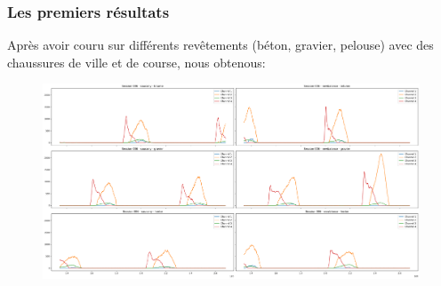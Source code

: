 \begin{frame}
    \frametitle{Les premiers résultats}
    Après avoir couru sur différents revêtements (béton, gravier, pelouse) avec des chaussures de ville et de course, nous obtenous:
    \begin{figure}
        \includegraphics[scale=0.22]{./figures/res_01.png}
        \centering
    \end{figure}
\end{frame}
